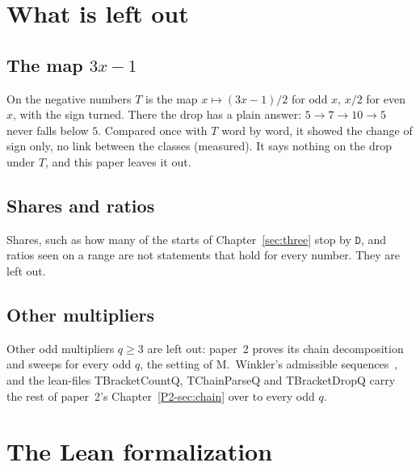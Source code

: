 \documentclass[10pt,a4paper,titlepage]{article}
\newcommand{\lean}[1]{\textsf{#1}}
\begin{document}
\section{What is left out}
\label{sec:leftout}

\subsection*{The map $3x - 1$}

On the negative numbers $T$ is the map $x \mapsto (3x - 1)/2$ for odd $x$, $x/2$ for even
$x$, with the sign turned. There the drop has a plain answer: $5 \to 7 \to 10 \to 5$ never
falls below $5$. Compared once with $T$ word by word, it showed the change of sign only, no link between
the classes (measured). It says nothing on the drop under $T$, and this paper leaves it out.

\subsection*{Shares and ratios}

Shares, such as how many of the starts of Chapter~\ref{sec:three} stop by $\mathtt{D}$, and
ratios seen on a range are not statements that hold for every number. They are left out.

\subsection*{Other multipliers}

Other odd multipliers $q \ge 3$ are left out: paper~2 proves its chain decomposition and
sweeps for every odd $q$, the setting of M.~Winkler's admissible sequences~\cite{Winkler2026b}, and the lean-files
\lean{TBracketCountQ}, \lean{TChainParseQ} and \lean{TBracketDropQ} carry the rest of paper~2's
Chapter~\ref{P2-sec:chain} over to every odd $q$.

\appendix
\section{The Lean formalization}
\label{app:lean}
\end{document}
